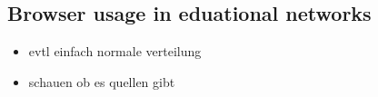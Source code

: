 %


\subsection{Browser usage in eduational networks}
\begin{itemize}
	\item evtl einfach normale verteilung
	\item schauen ob es quellen gibt
\end{itemize}


